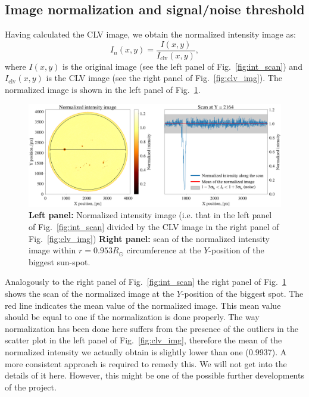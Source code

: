 \documentclass[paper=a4, fontsize=11pt]{article}
\numberwithin{equation}{section}
\numberwithin{figure}{section}
\numberwithin{table}{section}
\begin{document}
\subsection{Image normalization and signal/noise threshold}
Having calculated the CLV image, we obtain the normalized intensity image as:
\begin{equation}
I_n(x, y) = \frac{I(x, y)}{I_\mathrm{clv}(x, y)},
\end{equation}
where $I(x, y)$ is the original image (see the left panel of Fig.~\ref{fig:int_scan}) and $I_\mathrm{clv}(x, y)$ is the CLV image
(see the right panel of Fig.~\ref{fig:clv_img}). The normalized image is shown in the left panel of Fig.~\ref{fig:int_scan_norm}.
\begin{figure}[h!]
\centering
\includegraphics[scale = 0.307]{int_scan_norm}
\caption[]{\textbf{Left panel:} Normalized intensity image 
           (i.e. that in the left panel of Fig.~\ref{fig:int_scan} divided by the CLV image in the right panel of Fig.~\ref{fig:clv_img})
           \textbf{Right panel:} scan of the normalized intensity image within $r = 0.953R_\odot$ circumference at the $Y$-position of the biggest sun-spot.}
\label{fig:int_scan_norm}
\end{figure}

Analogously to the right panel of Fig.~\ref{fig:int_scan} 
the right panel of Fig.~\ref{fig:int_scan_norm} shows the scan of the normalized image at the $Y$-position of the biggest spot.
The red line indicates the mean value of the normalized image.
This mean value should be equal to one if the normalization is done properly.
The way normalization has been done here suffers from the presence of the outliers in the scatter plot in the left 
panel of Fig.~\ref{fig:clv_img}, therefore the mean of the normalized intensity we actually obtain is slightly lower than one (0.9937).
A more consistent approach is required to remedy this. 
We will not get into the details of it here.
However, this might be one of the possible further developments of the project.
\end{document}
